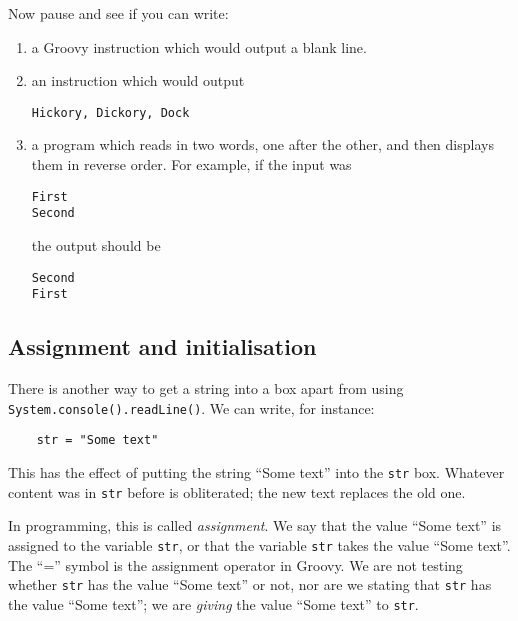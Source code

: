 Now pause and see if you can write:
\begin{enumerate}
\item
a Groovy instruction which would output a blank line.
\item
an instruction which would output

\begin{Verbatim}
Hickory, Dickory, Dock
\end{Verbatim}

\item
a program which reads in two words, one after the other, and then displays them
in reverse order. For example, if the input was 

\begin{Verbatim}
First
Second
\end{Verbatim}

the output should be

\begin{Verbatim}
Second
First
\end{Verbatim}

\end{enumerate}


\subsection{Assignment and initialisation}

There is another way to get a string into a box apart from using
\verb!System.console().readLine()!.  We can write, for instance:

\begin{Verbatim}
    str = "Some text"
\end{Verbatim}

This has the effect of putting the string ``Some text'' into the
\verb!str! box.  Whatever content was in \verb!str! before is obliterated; the
new text replaces the old one. 

In programming, this is called \emph{assignment}.  We say that the
value ``Some text'' is
assigned to the variable \verb!str!, or that the variable \verb!str! takes the
value ``Some text''.  The ``='' symbol is the assignment operator in Groovy.  We are not
testing whether \verb!str! has the value ``Some text'' or not, nor are we stating that
\verb!str! has the value ``Some text''; we are \emph{giving} the value
``Some text'' to \verb!str!.

